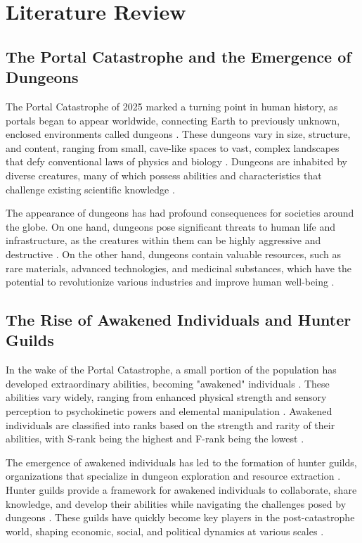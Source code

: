 \documentclass[12pt, a4paper]{article}
\begin{document}
\section{Literature Review}
\subsection{The Portal Catastrophe and the Emergence of Dungeons}
The Portal Catastrophe of 2025 marked a turning point in human history, as portals began to appear worldwide, connecting Earth to previously unknown, enclosed environments called dungeons \cite{Nakamura2025}. These dungeons vary in size, structure, and content, ranging from small, cave-like spaces to vast, complex landscapes that defy conventional laws of physics and biology \cite{Yamamoto2025}. Dungeons are inhabited by diverse creatures, many of which possess abilities and characteristics that challenge existing scientific knowledge \cite{Sato2025a}.

The appearance of dungeons has had profound consequences for societies around the globe. On one hand, dungeons pose significant threats to human life and infrastructure, as the creatures within them can be highly aggressive and destructive \cite{Watanabe2026}. On the other hand, dungeons contain valuable resources, such as rare materials, advanced technologies, and medicinal substances, which have the potential to revolutionize various industries and improve human well-being \cite{Mori2026}.

\subsection{The Rise of Awakened Individuals and Hunter Guilds}
In the wake of the Portal Catastrophe, a small portion of the population has developed extraordinary abilities, becoming "awakened" individuals \cite{Yamamoto2026}. These abilities vary widely, ranging from enhanced physical strength and sensory perception to psychokinetic powers and elemental manipulation \cite{Nakamura2026a}. Awakened individuals are classified into ranks based on the strength and rarity of their abilities, with S-rank being the highest and F-rank being the lowest \cite{Sato2025}.

The emergence of awakened individuals has led to the formation of hunter guilds, organizations that specialize in dungeon exploration and resource extraction \cite{Sato2025}. Hunter guilds provide a framework for awakened individuals to collaborate, share knowledge, and develop their abilities while navigating the challenges posed by dungeons \cite{Watanabe2026}. These guilds have quickly become key players in the post-catastrophe world, shaping economic, social, and political dynamics at various scales \cite{Yoshida2025}.
\end{document}
